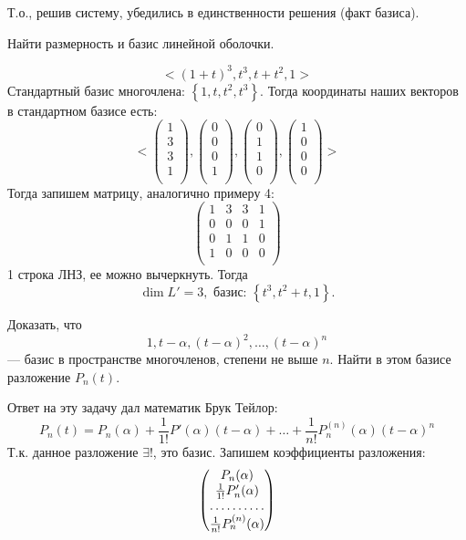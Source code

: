 Т.о., решив систему, убедились в единственности решения (факт базиса).
\begin{prim}
	Найти размерность и базис линейной оболочки.
\end{prim}
$$
<(1+t)^3, t^3, t+t^2, 1>
$$
Стандартный базис многочлена: $\left\{1, t, t^2, t^3 \right\}$.
Тогда координаты наших векторов в стандартном базисе есть:
$$
<
\begin{pmatrix}
1\\
3\\
3\\
1\\
\end{pmatrix}
,
\begin{pmatrix}
0\\
0\\
0\\
1\\
\end{pmatrix}
,
\begin{pmatrix}
0\\
1\\
1\\
0\\
\end{pmatrix}
,
\begin{pmatrix}
1\\
0\\
0\\
0\\
\end{pmatrix}
>
$$
Тогда запишем матрицу, аналогично примеру 4:
$$
\begin{pmatrix}
1 & 3 & 3 & 1\\
0 & 0 & 0 & 1\\
0 & 1 & 1 & 0\\
1 & 0 & 0 & 0\\
\end{pmatrix}
$$
1 строка ЛНЗ, ее можно вычеркнуть. Тогда
$$
\dim L'=3, \text{ базис: } \left\{t^3, t^2+t, 1\right\}.
$$
\begin{prim}
	Доказать, что
	$$
	1, t-\alpha, (t-\alpha)^2, \dots, (t-\alpha)^n
	$$
	--- базис в пространстве многочленов, степени не выше $n$. Найти в этом базисе разложение $P_n(t)$.
\end{prim}
Ответ на эту задачу дал математик Брук Тейлор:
$$
P_n(t)=P_n(\alpha)+\frac{1}{1!}P'(\alpha)(t-\alpha)+\dots+\frac{1}{n!}P^{(n)}_n(\alpha)(t-\alpha)^n
$$
Т.к. данное разложение $\exists !$, это базис. Запишем коэффициенты разложения:
$$
\begin{pmatrix}
P_n(\alpha)\\
\frac{1}{1!}P'_n(\alpha)\\
\hdotsfor{1}\\
\frac{1}{n!}P^{(n)}_n(\alpha)
\end{pmatrix}
$$
